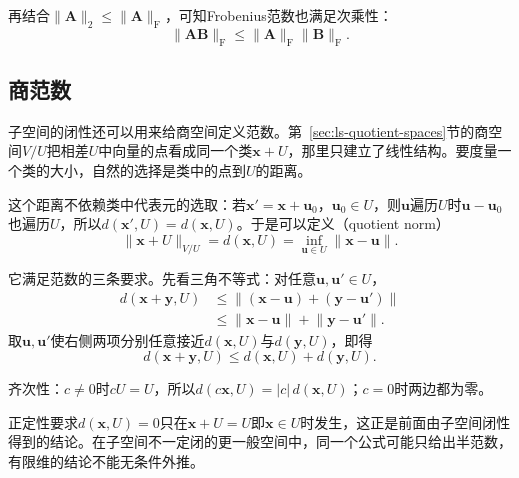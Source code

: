 再结合$\lVert\bm A\rVert_2\leq\lVert\bm A\rVert_{\mathrm F}$，可知Frobenius范数也满足次乘性：
\[
 \lVert\bm A\bm B\rVert_{\mathrm F}\leq\lVert\bm A\rVert_{\mathrm F}\lVert\bm B\rVert_{\mathrm F}.
\]

\subsection{商范数}
\label{sec:ls-quotient-norms}

子空间的闭性还可以用来给商空间定义范数。第~\ref{sec:ls-quotient-spaces}节的商空间$V/U$把相差$U$中向量的点看成同一个类$\bm x+U$，那里只建立了线性结构。要度量一个类的大小，自然的选择是类中的点到$U$的距离。

这个距离不依赖类中代表元的选取：若$\bm x'=\bm x+\bm u_0$，$\bm u_0\in U$，则$\bm u$遍历$U$时$\bm u-\bm u_0$也遍历$U$，所以$d(\bm x',U)=d(\bm x,U)$。于是可以定义（quotient norm）
\begin{equation}
 \lVert\bm x+U\rVert_{V/U}=d(\bm x,U)=\inf_{\bm u\in U}\lVert\bm x-\bm u\rVert .
 \label{eq:ls-quotient-norm}
\end{equation}

它满足范数的三条要求。先看三角不等式：对任意$\bm u,\bm u'\in U$，
\[
 \begin{aligned}
 d(\bm x+\bm y,U)
 &\leq\lVert(\bm x-\bm u)+(\bm y-\bm u')\rVert\\
 &\leq\lVert\bm x-\bm u\rVert+\lVert\bm y-\bm u'\rVert.
 \end{aligned}
\]
取$\bm u,\bm u'$使右侧两项分别任意接近$d(\bm x,U)$与$d(\bm y,U)$，即得
\[
 d(\bm x+\bm y,U)\leq d(\bm x,U)+d(\bm y,U).
\]

齐次性：$c\neq0$时$cU=U$，所以$d(c\bm x,U)=|c|\,d(\bm x,U)$；$c=0$时两边都为零。

正定性要求$d(\bm x,U)=0$只在$\bm x+U=U$即$\bm x\in U$时发生，这正是前面由子空间闭性得到的结论。在子空间不一定闭的更一般空间中，同一个公式可能只给出半范数，有限维的结论不能无条件外推。

